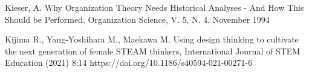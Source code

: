 \documentclass[
12pt,		%
openright,	%
twoside,  %
a4paper,			%
chapter=TITLE,		%
english,			%
french,				%
spanish,			%
brazil				%
]{USPSC-classe/USPSC}
\begin{document}
\begin{flushleft}
\begin{flushleft}
\begin{flushleft}
\begin{flushleft}
\begin{flushleft}
\begin{flushleft}
\begin{flushleft}
\begin{flushleft}
\begin{flushleft}
[KIESER, 1994] Kieser, A. Why Organization Theory Needs Historical Analyses - And How This Should be Performed, Organization Science, V. 5, N. 4, November 1994
\end{flushleft}


\end{flushleft}


\end{flushleft}


\end{flushleft}


\end{flushleft}


\end{flushleft}


\end{flushleft}


\end{flushleft}


\end{flushleft}


\begin{flushleft}
\begin{flushleft}
\begin{flushleft}
\begin{flushleft}
\begin{flushleft}
\begin{flushleft}
\begin{flushleft}
\begin{flushleft}
\begin{flushleft}
[KIJIMA et al., 2021] Kijima R., Yang-Yoshihara M., Maekawa M. Using design thinking to cultivate the next generation of female STEAM thinkers, International Journal of STEM Education (2021) 8:14 https://doi.org/10.1186/s40594-021-00271-6
\end{flushleft}


\end{flushleft}


\end{flushleft}


\end{flushleft}


\end{flushleft}


\end{flushleft}


\end{flushleft}


\end{flushleft}


\end{flushleft}
\end{document}
